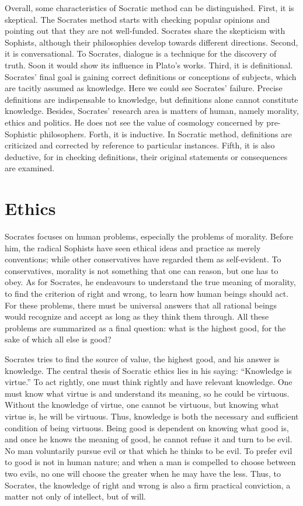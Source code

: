 \documentclass[11pt]{article}
\begin{document}
Overall, some characteristics of Socratic method can be distinguished. 
First, it is skeptical. 
The Socrates method starts with checking popular opinions and pointing out that they are not well-funded. 
Socrates share the skepticism with Sophists, although their philosophies develop towards different directions. 
Second, it is conversational. 
To Socrates, dialogue is a technique for the discovery of truth. 
Soon it would show its influence in Plato’s works. 
Third, it is definitional. 
Socrates’ final goal is gaining correct definitions or conceptions of subjects, which are tacitly assumed as knowledge. 
Here we could see Socrates’ failure. 
Precise definitions are indispensable to knowledge, but definitions alone cannot constitute knowledge. 
Besides, Socrates’ research area is matters of human, namely morality, ethics and politics. 
He does not see the value of cosmology concerned by pre-Sophistic philosophers. 
Forth, it is inductive. 
In Socratic method, definitions are criticized and corrected by reference to particular instances. 
Fifth, it is also deductive, for in checking definitions, their original statements or consequences are examined.
  
\section{Ethics} 
Socrates focuses on human problems, especially the problems of morality. 
Before him, the radical Sophists have seen ethical ideas and practice as merely conventions; while other conservatives have regarded them as self-evident. 
To conservatives, morality is not something that one can reason, but one has to obey. 
As for Socrates, he endeavours to understand the true meaning of morality, to find the criterion of right and wrong, to learn how human beings should act. 
For these problems, there must be universal answers that all rational beings would recognize and accept as long as they think them through. 
All these problems are summarized as a final question: what is the highest good, for the sake of which all else is good?

\newline

Socrates tries to find the source of value, the highest good, and his answer is knowledge. 
The central thesis of Socratic ethics lies in his saying: 
“Knowledge is virtue.” 
To act rightly, one must think rightly and have relevant knowledge. 
One must know what virtue is and understand its meaning, so he could be virtuous. 
Without the knowledge of virtue, one cannot be virtuous, but knowing what virtue is, he will be virtuous. 
Thus, knowledge is both the necessary and sufficient condition of being virtuous. 
Being good is dependent on knowing what good is, and once he knows the meaning of good, he cannot refuse it and turn to be evil. 
No man voluntarily pursue evil or that which he thinks to be evil. 
To prefer evil to good is not in human nature; 
and when a man is compelled to choose between two evils, no one will choose the greater when he may have the less.
Thus, to Socrates, the knowledge of right and wrong is also a firm practical conviction, a matter not only of intellect, but of will.
\end{document}
